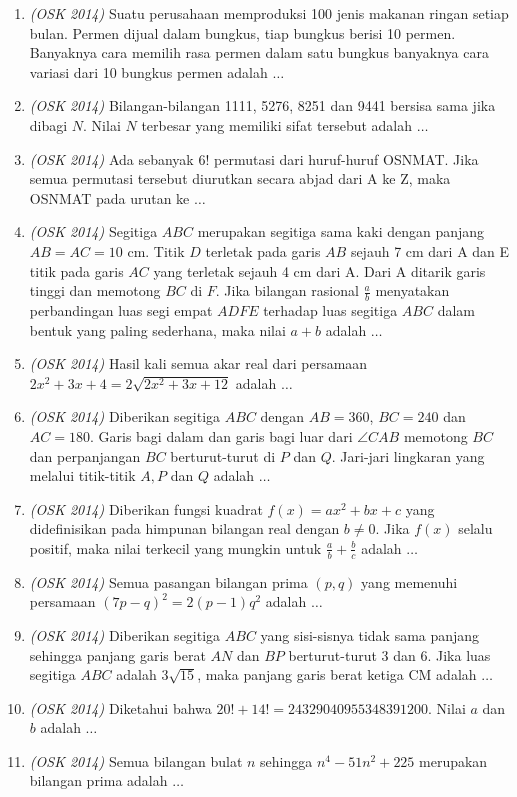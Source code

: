 \begin{enumerate}
	\item \textit{(OSK 2014)} Suatu perusahaan memproduksi 100 jenis makanan ringan setiap bulan. Permen dijual dalam bungkus, tiap bungkus berisi 10 permen. Banyaknya cara memilih rasa permen dalam satu bungkus banyaknya cara variasi dari 10 bungkus permen adalah $\dots$
	
	\item \textit{(OSK 2014)} Bilangan-bilangan 1111, 5276, 8251 dan 9441 bersisa sama jika dibagi $N$. Nilai $N$ terbesar yang memiliki sifat tersebut adalah $\dots$
	
	\item \textit{(OSK 2014)} Ada sebanyak $6!$ permutasi dari huruf-huruf OSNMAT. Jika semua permutasi tersebut diurutkan secara abjad dari A ke Z, maka OSNMAT pada urutan ke $\dots$
	
	\item \textit{(OSK 2014)} Segitiga $ABC$ merupakan segitiga sama kaki dengan panjang $AB = AC = 10$ cm. Titik $D$ terletak pada garis $AB$ sejauh 7 cm dari A dan E titik pada garis $AC$ yang terletak sejauh 4 cm dari A. Dari A ditarik garis tinggi dan memotong $BC$ di $F$. Jika bilangan rasional $\frac{a}{b}$ menyatakan perbandingan luas segi empat $ADFE$ terhadap luas segitiga $ABC$ dalam bentuk yang paling sederhana, maka nilai $a+b$ adalah $\dots$
	
	\item \textit{(OSK 2014)} Hasil kali semua akar real dari persamaan $2x^2 + 3x + 4 = 2\sqrt{2x^2 + 3x + 12}$ adalah $\dots$
	
	\item \textit{(OSK 2014)} Diberikan segitiga $ABC$ dengan $AB = 360$, $BC = 240$ dan $AC = 180$. Garis bagi dalam dan garis bagi luar dari $\angle CAB$ memotong $BC$ dan perpanjangan $BC$ berturut-turut di $P$ dan $Q$. Jari-jari lingkaran yang melalui titik-titik $A, P$ dan $Q$ adalah $\dots$
	
	\item \textit{(OSK 2014)} Diberikan fungsi kuadrat $f(x) = ax^2 + bx + c$ yang didefinisikan pada himpunan bilangan real dengan $b \ne 0$. Jika $f(x)$ selalu positif, maka nilai terkecil yang mungkin untuk $\frac{a}{b} + \frac{b}{c}$ adalah $\dots$
	
	\item \textit{(OSK 2014)} Semua pasangan bilangan prima $(p,q)$ yang memenuhi persamaan $(7p - q)^2 = 2(p - 1)q^2$ adalah $\dots$
	
	\item \textit{(OSK 2014)} Diberikan segitiga $ABC$ yang sisi-sisnya tidak sama panjang sehingga panjang garis berat $AN$ dan $BP$ berturut-turut 3 dan 6. Jika luas segitiga $ABC$ adalah $3\sqrt{15}$, maka panjang garis berat ketiga CM adalah $\dots$
	
	\item \textit{(OSK 2014)} Diketahui bahwa $20! + 14! = 24329040955348391200$. Nilai $a$ dan $b$ adalah $\dots$
	
	\item \textit{(OSK 2014)} Semua bilangan bulat $n$ sehingga $n^4 - 51n^2 + 225$ merupakan bilangan prima adalah $\dots$
\end{enumerate}
\newpage

